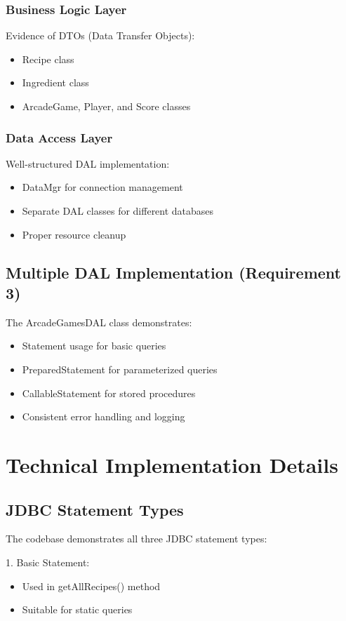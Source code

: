 \documentclass{article}
\begin{document}
\subsubsection{Business Logic Layer}
Evidence of DTOs (Data Transfer Objects):
\begin{itemize}
    \item Recipe class
    \item Ingredient class
    \item ArcadeGame, Player, and Score classes
\end{itemize}

\subsubsection{Data Access Layer}
Well-structured DAL implementation:
\begin{itemize}
    \item DataMgr for connection management
    \item Separate DAL classes for different databases
    \item Proper resource cleanup
\end{itemize}

\subsection{Multiple DAL Implementation (Requirement 3)}
The ArcadeGamesDAL class demonstrates:
\begin{itemize}
    \item Statement usage for basic queries
    \item PreparedStatement for parameterized queries
    \item CallableStatement for stored procedures
    \item Consistent error handling and logging
\end{itemize}

\section{Technical Implementation Details}

\subsection{JDBC Statement Types}
The codebase demonstrates all three JDBC statement types:

1. Basic Statement:
\begin{itemize}
    \item Used in getAllRecipes() method
    \item Suitable for static queries
\end{itemize}
\end{document}
